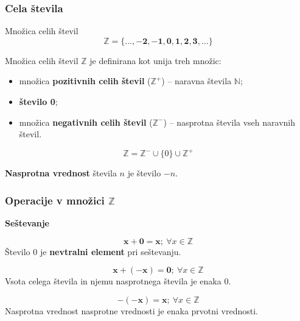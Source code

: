        \begin{frame}
            \frametitle{Cela števila}

                \begin{alertblock}{Množica celih števil}
                    $$\mathbf{\mathbb{Z} = \{\ldots, -2, -1, 0, 1, 2, 3, \ldots\}}$$
                \end{alertblock}

                \begin{block}{}
                    Množica celih števil $\mathbb{Z}$ je definirana kot unija treh množic:
                        \begin{itemize}
                            \item množica \textbf{pozitivnih celih števil} ($\mathbb{Z}^+$) -- naravna števila $\mathbb{N}$;
                            \item \textbf{število 0};
                            \item množica \textbf{negativnih celih števil} ($\mathbb{Z}^-$) -- nasprotna števila vseh naravnih števil.
                        \end{itemize}
                      $$\mathbb{Z} = \mathbb{Z}^- \cup \{0\} \cup \mathbb{Z}^+$$

                \end{block}

                \begin{block}{}
                    \textbf{Nasprotna vrednost} števila $n$ je število $-n$.
                \end{block}
        \end{frame}

        \begin{frame}
            \frametitle{Operacije v množici $\mathbb{Z}$}

            \textbf{\large{Seštevanje}}

            \begin{block}{}
                $$\mathbf{x+0=x}; ~\forall x\in\mathbb{Z}$$
                Število $0$ je \textbf{nevtralni element} pri seštevanju.
            \end{block}

            \begin{block}{}
                $$\mathbf{x+(-x)=0}; ~\forall x\in\mathbb{Z} $$
                Vsota celega števila in njemu nasprotnega števila je enaka $0$.
            \end{block}

            \begin{block}{}
                $$\mathbf{-(-x)=x}; ~\forall x\in\mathbb{Z}$$
                Nasprotna vrednost nasprotne vrednosti je enaka prvotni vrednosti.
            \end{block}
        \end{frame}


